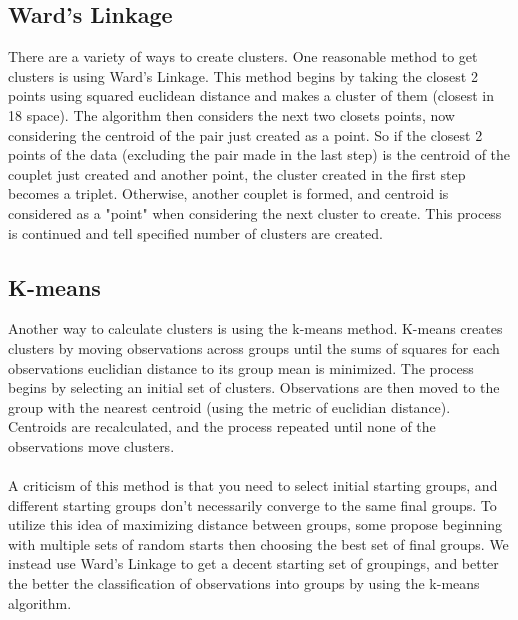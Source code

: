 \documentclass[11pt]{article}
\begin{document}
\subsection*{Ward's Linkage}
There are a variety of ways to create clusters. One reasonable method to get
clusters is using Ward's Linkage. This method begins by taking the closest 2
points using squared euclidean distance and makes a cluster of them (closest in
18 space). The algorithm then considers the next two closets points, now
considering the centroid of the pair just created as a point. So if the closest
2 points of the data (excluding the pair made in the last step) is the centroid
of the couplet just created and another point, the cluster created in the first
step becomes a triplet. Otherwise, another couplet is formed, and centroid is
considered as a "point" when considering the next cluster to create. This
process is continued and tell specified number of clusters are created. 

\subsection*{K-means}
Another way to calculate clusters is using the k-means method. K-means creates
clusters by moving observations across groups until the sums of squares for each
observations euclidian distance to its group mean is minimized. The process
begins by selecting an initial set of clusters. Observations are then moved to
the group with the nearest centroid (using the metric of euclidian distance).
Centroids are recalculated, and the process repeated until none of the
observations move clusters.  
\\
\\
A criticism of this method is that you need to select initial starting groups,
and different starting groups don't necessarily converge to the same final
groups. To utilize this idea of maximizing distance between groups, some propose
beginning with multiple sets of random starts then choosing the best set of
final groups. We instead use Ward's Linkage to get a decent starting set of
groupings, and better the better the classification of observations into groups
by using the k-means algorithm.
\end{document}
